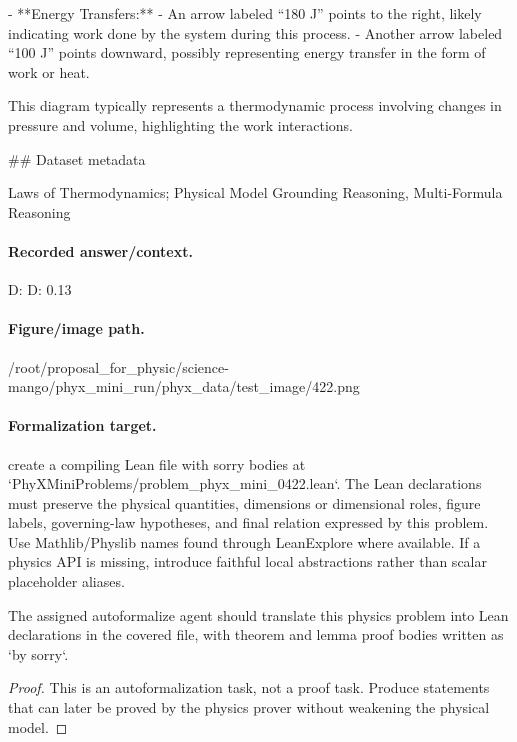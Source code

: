 - **Energy Transfers:**
  - An arrow labeled “180 J” points to the right, likely indicating work done by the system during this process.
  - Another arrow labeled “100 J” points downward, possibly representing energy transfer in the form of work or heat.

This diagram typically represents a thermodynamic process involving changes in pressure and volume, highlighting the work interactions.

\#\# Dataset metadata

Laws of Thermodynamics; Physical Model Grounding Reasoning, Multi-Formula Reasoning

\paragraph{Recorded answer/context.}
D: D: 0.13

\paragraph{Figure/image path.}
/root/proposal\_for\_physic/science-mango/phyx\_mini\_run/phyx\_data/test\_image/422.png

\paragraph{Formalization target.}
create a compiling Lean file with sorry bodies at `PhyXMiniProblems/problem\_phyx\_mini\_0422.lean`. The Lean declarations must preserve the physical quantities, dimensions or dimensional roles, figure labels, governing-law hypotheses, and final relation expressed by this problem.
Use Mathlib/Physlib names found through LeanExplore where available. If a physics API is missing, introduce faithful local abstractions rather than scalar placeholder aliases.

\begin{theorem}
\label{thm:physics:phyx_mini_0422:target}
The assigned autoformalize agent should translate this physics problem into Lean declarations in the covered file, with theorem and lemma proof bodies written as `by sorry`.
\end{theorem}
\begin{proof}
This is an autoformalization task, not a proof task. Produce statements that can later be proved by the physics prover without weakening the physical model.
\end{proof}

